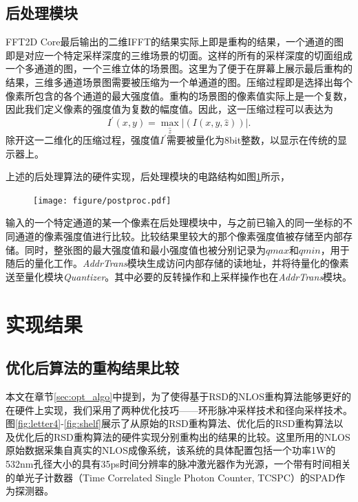 \documentclass[master]{shtthesis}             %
\begin{document}
\section{后处理模块}

FFT2D Core最后输出的二维IFFT的结果实际上即是重构的结果，一个通道的图即是对应一个特定采样深度的三维场景的切面。这样的所有的采样深度的切面组成一个多通道的图，一个三维立体的场景图。这里为了便于在屏幕上展示最后重构的结果，三维多通道场景图需要被压缩为一个单通道的图。压缩过程即是选择出每个像素所包含的各个通道的最大强度值。重构的场景图的像素值实际上是一个复数，因此我们定义像素的强度值为复数的幅度值。因此，这一压缩过程可以表达为
\begin{equation}
    I^{\prime}(x, y) = \max_{\hat{z}} |(I(x, y, \hat{z}))|.
\end{equation}
除开这一二维化的压缩过程，强度值$I^\prime$需要被量化为8bit整数，以显示在传统的显示器上。

上述的后处理算法的硬件实现，后处理模块的电路结构如图\ref{fig:pp}所示，
\begin{figure}[!tb]
    \centering
    \texttt{[image: figure/postproc.pdf]}
    \label{fig:pp}
\end{figure}
输入的一个特定通道的某一个像素在后处理模块中，与之前已输入的同一坐标的不同通道的像素强度值进行比较。比较结果里较大的那个像素强度值被存储至内部存储。同时，整张图的最大强度值和最小强度值也被分别记录为$qmax$和$qmin$，用于随后的量化工作。\textit{AddrTrans}模块生成访问内部存储的读地址，并将待量化的像素送至量化模块\textit{Quantizer}。其中必要的反转操作和上采样操作也在\textit{AddrTrans}模块。

\chapter{实现结果}
\section{优化后算法的重构结果比较}

本文在章节\ref{sec:opt_algo}中提到，为了使得基于RSD的NLOS重构算法能够更好的在硬件上实现，我们采用了两种优化技巧——环形脉冲采样技术和径向采样技术。图\ref{fig:letter4}-\ref{fig:shelf}展示了从原始的RSD重构算法、优化后的RSD重构算法以及优化后的RSD重构算法的硬件实现分别重构出的结果的比较。这里所用的NLOS原始数据采集自真实的NLOS成像系统\citep{Liu}，该系统的具体配置包括一个功率1W的532nm孔径大小的具有35ps时间分辨率的脉冲激光器作为光源，一个带有时间相关的单光子计数器（Time Correlated Single Photon Counter, TCSPC）的SPAD作为探测器。
\end{document}
